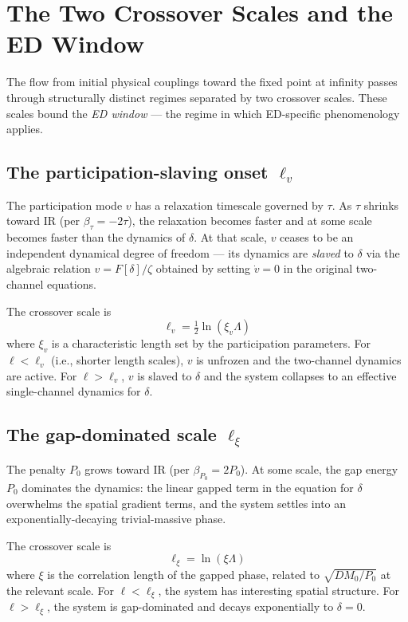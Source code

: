 \documentclass[11pt,a4paper]{article}
\begin{document}
\section{The Two Crossover Scales and the ED Window}

The flow from initial physical couplings toward the fixed point at infinity passes through structurally distinct regimes separated by two crossover scales. These scales bound the \emph{ED window} --- the regime in which ED-specific phenomenology applies.

\subsection{The participation-slaving onset $\ell_v$}

The participation mode $v$ has a relaxation timescale governed by $\tau$. As $\tau$ shrinks toward IR (per $\beta_\tau = -2\tau$), the relaxation becomes faster and at some scale becomes faster than the dynamics of $\delta$. At that scale, $v$ ceases to be an independent dynamical degree of freedom --- its dynamics are \emph{slaved} to $\delta$ via the algebraic relation $v = F[\delta]/\zeta$ obtained by setting $\dot{v} = 0$ in the original two-channel equations.

The crossover scale is
\[
\ell_v = \tfrac{1}{2} \ln(\xi_v \Lambda)
\]
where $\xi_v$ is a characteristic length set by the participation parameters. For $\ell < \ell_v$ (i.e., shorter length scales), $v$ is unfrozen and the two-channel dynamics are active. For $\ell > \ell_v$, $v$ is slaved to $\delta$ and the system collapses to an effective single-channel dynamics for $\delta$.

\subsection{The gap-dominated scale $\ell_\xi$}

The penalty $P_0$ grows toward IR (per $\beta_{P_0} = 2P_0$). At some scale, the gap energy $P_0$ dominates the dynamics: the linear gapped term in the equation for $\delta$ overwhelms the spatial gradient terms, and the system settles into an exponentially-decaying trivial-massive phase.

The crossover scale is
\[
\ell_\xi = \ln(\xi \Lambda)
\]
where $\xi$ is the correlation length of the gapped phase, related to $\sqrt{D M_0/P_0}$ at the relevant scale. For $\ell < \ell_\xi$, the system has interesting spatial structure. For $\ell > \ell_\xi$, the system is gap-dominated and decays exponentially to $\delta = 0$.
\end{document}
